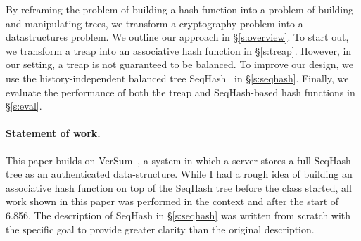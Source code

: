 By reframing the problem of building a hash function into a problem of building
and manipulating trees, we transform a cryptography problem into a
datastructures problem. We outline our approach in \S\ref{s:overview}.  To
start out, we transform a treap into an associative hash function in
\S\ref{s:treap}. However, in our setting, a treap is not guaranteed to be
balanced. To improve our design, we use the history-independent balanced tree
SeqHash~\cite{versum:ccs14} in \S\ref{s:seqhash}. %
Finally, we evaluate the performance of both the treap
and SeqHash-based hash functions in \S\ref{s:eval}.

\paragraph{Statement of work.} This paper builds on VerSum~\cite{versum:ccs14},
a system in which a server stores a full SeqHash tree as an authenticated
data-structure. While I had a rough idea of building an associative hash
function on top of the SeqHash tree before the class started, all work shown in
this paper was performed in the context and after the start of 6.856. The
description of SeqHash in \S\ref{s:seqhash} was written from scratch with the
specific goal to provide greater clarity than the original description.

